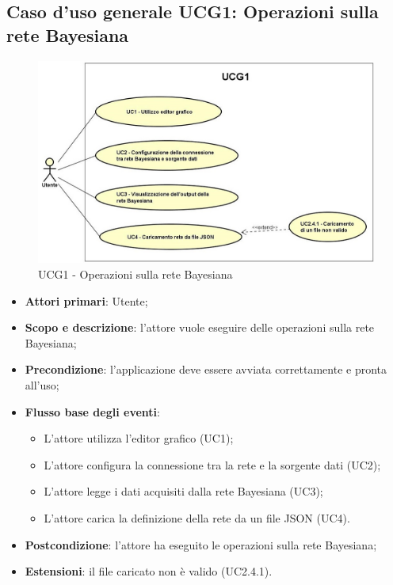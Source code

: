 \newpage
\subsection{Caso d'uso generale UCG1: Operazioni sulla rete Bayesiana}
\begin{figure} [H]
	\centering
	\includegraphics[scale=0.7]{Img/UCG1}
	\caption{UCG1 - Operazioni sulla rete Bayesiana}\label{}
\end{figure}
\begin{itemize} 
	\item{\textbf{Attori primari}: Utente;}
	\item{\textbf{Scopo e descrizione}: l'attore vuole eseguire delle operazioni sulla rete Bayesiana;} 
	\item{\textbf{Precondizione}: l'applicazione deve essere avviata correttamente e pronta all'uso;} 
	\item{\textbf{Flusso base degli eventi}: 
		\begin{itemize} 
			\item{L'attore utilizza l'editor grafico (UC1);} 
			\item{L'attore configura la connessione tra la rete e la sorgente dati (UC2);} 
			\item{L'attore legge i dati acquisiti dalla rete Bayesiana (UC3)}; 
			\item{L'attore carica la definizione della rete da un file JSON (UC4).} 
		\end{itemize} 
	} 
	\item{\textbf{Postcondizione}: l'attore ha eseguito le operazioni sulla rete Bayesiana;} 
	\item{\textbf{Estensioni}: il file caricato non è valido (UC2.4.1).} 
\end{itemize}	

